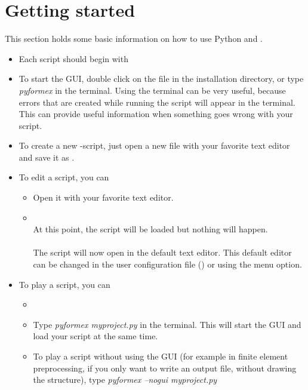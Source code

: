 \section{Getting started}
\label{sec:getting-started}

This section holds some basic information on how to use Python and \pyformex. 

\begin{itemize}
\item Each script should begin with 
\item To start the \pyformex GUI, double click on the file  in the installation directory, or type \emph{pyformex} in the terminal. Using the terminal can be very useful, because errors that are created while running the script will appear in the terminal. This can provide useful information when something goes wrong with your script.
\item To create a new \pyformex-script, just open a new file with your favorite text editor and save it as .
\item To edit a script, you can
	\begin{itemize}
	\item Open it with your favorite text editor.
	\item {}\\
	At this point, the script will be loaded but nothing will happen. \\
	\\
	The script will now open in the default text editor. This default editor can be changed in the user configuration file () or using the  menu option.
	\end{itemize}
\item To play a script, you can
	\begin{itemize}
	\item {}\\
	\item Type \emph{pyformex myproject.py} in the terminal. This will start the \pyformex GUI and load your script at the same time. \\
	\item To play a script without using the GUI (for example in finite element preprocessing, if you only want to write an 		output file, without drawing the structure), type \emph{pyformex --nogui myproject.py}

\end{itemize}
\end{itemize}
